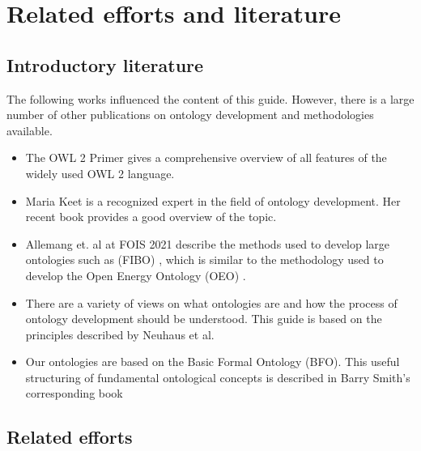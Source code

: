 \section{Related efforts and literature}
\label{sec:related}

\subsection{Introductory literature}



The following works influenced the content of this guide. However, there is a large number of other publications on ontology development and methodologies available.   
\begin{itemize}
    \item The OWL 2 Primer gives a comprehensive overview of all features of the widely used OWL 2 language. \cite{owlprimer}
    \item Maria Keet is a recognized expert in the field of ontology development. Her recent book provides a good overview of the topic. \cite{keet2018introduction}
	\item Allemang et. al at FOIS 2021 \cite{kendall-workflow} describe the methods used to develop large ontologies such as (FIBO) \cite{fibo2013}, which is similar to the methodology used to develop the Open Energy Ontology (OEO) \cite{oeo2021}.
    \item There are a variety of views on what ontologies are and how the process of ontology development should be understood. This guide is based on the principles described by Neuhaus et al. \cite{Neuhaus2022OntologyDI, neuhaus2018ontology}
    \item Our ontologies are based on the Basic Formal Ontology (BFO). This useful structuring of fundamental ontological concepts is described in Barry Smith's corresponding book \cite{bfo-book}
\end{itemize}

\subsection{Related efforts}

